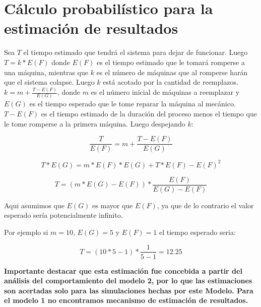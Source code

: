 \documentclass[11pt]{article}
\begin{document}
    \newpage

    \section{Cálculo probabilístico para la estimación de resultados}
    Sea $T$ el tiempo estimado que tendrá el sistema para dejar de funcionar.
    Luego $T=k*E(F)$ donde $E(F)$ es el tiempo estimado que le tomará romperse 
    a una máquina, mientras que $k$ es el número de máquinas que al romperse harán que
    el sistema colapse. Luego $k$ está acotado por la cantidad de reemplazos.
    $k=m+\frac{T-E(F)}{E(G)}$, donde $m$ es el número inicial de máquinas a reemplazar y
    $E(G)$ es el tiempo esperado que le tome reparar la máquina al mecánico. $T-E(F)$ es
    el tiempo estimado de la duración del proceso menos el tiempo que le tome romperse
    a la primera máquina. Luego despejando $k$: \vspace{5mm}


    $$\frac{T}{E(F)}=m+\frac{T-E(F)}{E(G)}$$

    $$T*E(G) = m*E(F)*E(G) + T*E(F) - E(F)^2$$

    $$T=(m*E(G) - E(F)) * \frac{E(F)}{E(G) - E(F)}$$  \vspace{5mm}

    \noindent Aqui asumimos que $E(G)$ es mayor que $E(F)$, ya que de lo contrario el valor esperado
    sería potencialmente infinito.

    \noindent Por ejemplo si $m=10$, $E(G)=5$ y $E(F)=1$ el tiempo esperado seria:

    \noindent $$T=(10*5 - 1) * \frac{1}{5 - 1} = 12.25$$

    \textbf{Importante destacar que esta estimación fue concebida a partir del análisis del comportamiento
    del modelo 2, por lo que las estimaciones son acertadas solo para las simulaciones hechas por este Modelo.
    Para el modelo 1 no encontramos mecanismo de estimación de resultados.}

    \newpage
\end{document}
